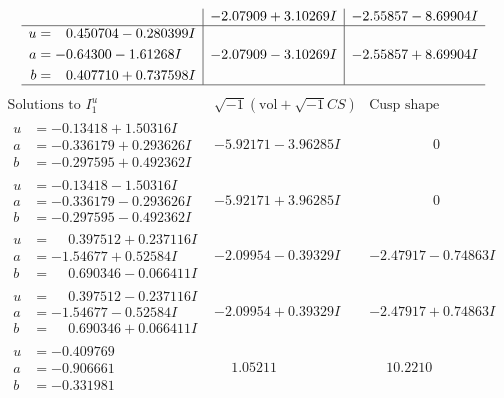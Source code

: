 \documentclass[1p]{elsarticle_modified}
\theoremstyle{definition}
\newcommand{\I}{\sqrt{-1}}
\begin{document}
$$\begin{array}{c|c|c}
 & -2.07909 + 3.10269 I & -2.55857 - 8.69904 I \\ \hline\begin{aligned}
u &= \phantom{-}0.450704 - 0.280399 I \\
a &= -0.64300 - 1.61268 I \\
b &= \phantom{-}0.407710 + 0.737598 I\end{aligned}
 & -2.07909 - 3.10269 I & -2.55857 + 8.69904 I\\
 \hline 
 \end{array}$$\newpage$$\begin{array}{c|c|c}  
\text{Solutions to }I^u_{1}& \I (\text{vol} + \sqrt{-1}CS) & \text{Cusp shape}\\
 \hline 
\begin{aligned}
u &= -0.13418 + 1.50316 I \\
a &= -0.336179 + 0.293626 I \\
b &= -0.297595 + 0.492362 I\end{aligned}
 & -5.92171 - 3.96285 I & \phantom{-0.000000 } 0 \\ \hline\begin{aligned}
u &= -0.13418 - 1.50316 I \\
a &= -0.336179 - 0.293626 I \\
b &= -0.297595 - 0.492362 I\end{aligned}
 & -5.92171 + 3.96285 I & \phantom{-0.000000 } 0 \\ \hline\begin{aligned}
u &= \phantom{-}0.397512 + 0.237116 I \\
a &= -1.54677 + 0.52584 I \\
b &= \phantom{-}0.690346 - 0.066411 I\end{aligned}
 & -2.09954 - 0.39329 I & -2.47917 - 0.74863 I \\ \hline\begin{aligned}
u &= \phantom{-}0.397512 - 0.237116 I \\
a &= -1.54677 - 0.52584 I \\
b &= \phantom{-}0.690346 + 0.066411 I\end{aligned}
 & -2.09954 + 0.39329 I & -2.47917 + 0.74863 I \\ \hline\begin{aligned}
u &= -0.409769\phantom{ +0.000000I} \\
a &= -0.906661\phantom{ +0.000000I} \\
b &= -0.331981\phantom{ +0.000000I}\end{aligned}
 & \phantom{-}1.05211\phantom{ +0.000000I} & \phantom{-}10.2210\phantom{ +0.000000I} \\ \hline\begin{aligned}

\end{aligned}
\end{array}$$
\end{document}
